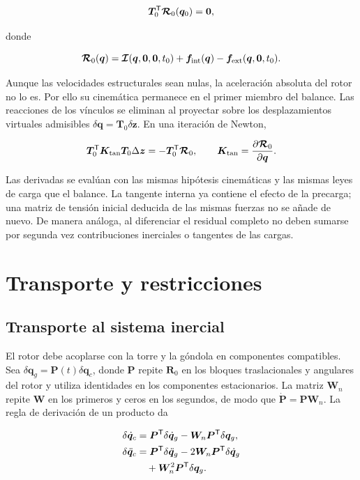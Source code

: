 \begin{equation}
\bm T_0^\mathsf T\bm{\mathcal R}_0(\bm q_0)=\bm0,
\label{eq:equilibrium}
\end{equation}

donde

\begin{equation}
\bm{\mathcal R}_0(\bm q)=
\bm{\mathcal I}(\bm q,\bm0,\bm0,t_0)
+\bm f_{\rm int}(\bm q)-\bm f_{\rm ext}(\bm q,\bm0,t_0).
\end{equation}

Aunque las velocidades estructurales sean nulas, la aceleración absoluta del rotor no lo es. Por ello su cinemática permanece en el primer miembro del balance. Las reacciones de los vínculos se eliminan al proyectar sobre los desplazamientos virtuales admisibles $\delta\bm q=\bm T_0\delta\bm z$. En una iteración de Newton,

\begin{equation}
\bm T_0^\mathsf T\bm K_{\rm tan}\bm T_0\Delta\bm z
=-\bm T_0^\mathsf T\bm{\mathcal R}_0,\qquad
\bm K_{\rm tan}=\frac{\partial\bm{\mathcal R}_0}{\partial\bm q}.
\end{equation}

Las derivadas se evalúan con las mismas hipótesis cinemáticas y las mismas leyes de carga que el balance. La tangente interna ya contiene el efecto de la precarga; una matriz de tensión inicial deducida de las mismas fuerzas no se añade de nuevo. De manera análoga, al diferenciar el residual completo no deben sumarse por segunda vez contribuciones inerciales o tangentes de las cargas.

\section{Transporte y restricciones}
\label{sec:transporte}
\subsection{Transporte al sistema inercial}
El rotor debe acoplarse con la torre y la góndola en componentes compatibles. Sea $\delta\bm q_g=\bm P(t)\delta\bm q_c$, donde $\bm P$ repite $\bm R_0$ en los bloques traslacionales y angulares del rotor y utiliza identidades en los componentes estacionarios. La matriz $\bm W_n$ repite $\bm W$ en los primeros y ceros en los segundos, de modo que $\dot{\bm P}=\bm P\bm W_n$. La regla de derivación de un producto da

\begin{align}
\delta\dot{\bm q}_c
&=\bm P^\mathsf T\delta\dot{\bm q}_g-\bm W_n\bm P^\mathsf T\delta\bm q_g,\nonumber\\
\delta\ddot{\bm q}_c
&=\bm P^\mathsf T\delta\ddot{\bm q}_g-2\bm W_n\bm P^\mathsf T\delta\dot{\bm q}_g\nonumber\\
&\quad+\bm W_n^2\bm P^\mathsf T\delta\bm q_g.
\end{align}

